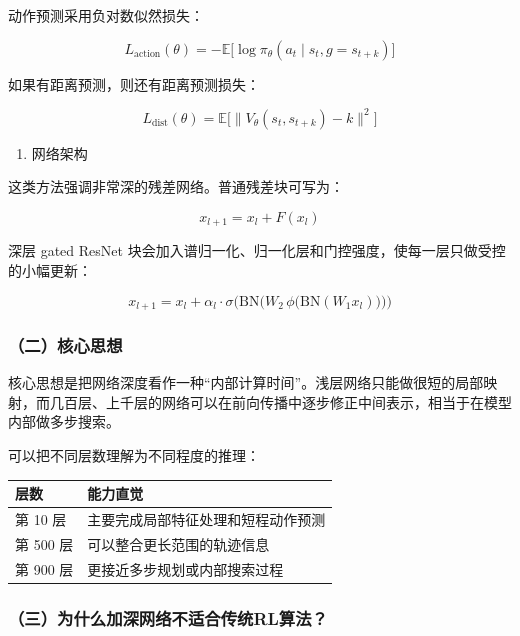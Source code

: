 动作预测采用负对数似然损失：

\[
L_{\mathrm{action}}(\theta)
=
-
\mathbb{E}
\bigl[
\log \pi_\theta(a_t\mid s_t,g=s_{t+k})
\bigr]
\]

如果有距离预测，则还有距离预测损失：

\[
L_{\mathrm{dist}}(\theta)
=
\mathbb{E}
\bigl[
\lVert
V_\theta(s_t,s_{t+k})-k
\rVert^{2}
\bigr]
\]

\begin{enumerate}
\def\labelenumi{\arabic{enumi}.}
\setcounter{enumi}{2}
\tightlist
\item
  网络架构
\end{enumerate}

这类方法强调非常深的残差网络。普通残差块可写为：

\[
x_{l+1}=x_l+F(x_l)
\]

深层 gated ResNet 块会加入谱归一化、归一化层和门控强度，使每一层只做受控的小幅更新：

\[
x_{l+1}
=
x_l
+
\alpha_l\cdot
\sigma
\bigl(
\mathrm{BN}
\bigl(
W_2\,
\phi
\bigl(
\mathrm{BN}(W_1x_l)
\bigr)
\bigr)
\bigr)
\]

\hypertarget{ux4e8cux6838ux5fc3ux601dux60f3}{%
\subsubsection{（二）核心思想}\label{ux4e8cux6838ux5fc3ux601dux60f3}}

核心思想是把网络深度看作一种``内部计算时间''。浅层网络只能做很短的局部映射，而几百层、上千层的网络可以在前向传播中逐步修正中间表示，相当于在模型内部做多步搜索。

可以把不同层数理解为不同程度的推理：

\begin{longtable}[]{@{}ll@{}}
\toprule
层数 & 能力直觉 \\
\midrule
\endhead
第 10 层 & 主要完成局部特征处理和短程动作预测 \\
第 500 层 & 可以整合更长范围的轨迹信息 \\
第 900 层 & 更接近多步规划或内部搜索过程 \\
\bottomrule
\end{longtable}

\hypertarget{ux4e09ux4e3aux4ec0ux4e48ux52a0ux6df1ux7f51ux7edcux4e0dux9002ux5408ux4f20ux7edfrlux7b97ux6cd5}{%
\subsubsection{（三）为什么加深网络不适合传统RL算法？}\label{ux4e09ux4e3aux4ec0ux4e48ux52a0ux6df1ux7f51ux7edcux4e0dux9002ux5408ux4f20ux7edfrlux7b97ux6cd5}}

